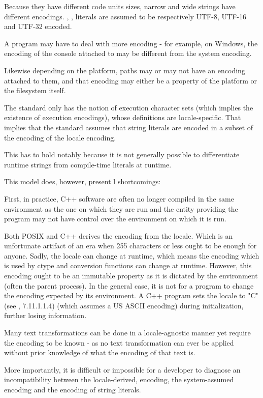 \documentclass{wg21}
\begin{document}
\note Because they have different code units sizes, narrow and wide strings have different encodings.
, ,  literals are assumed to be respectively UTF-8, UTF-16 and UTF-32 encoded.
\endnote

\note A program may have to deal with more encoding - for example, on Windows, the encoding of the console attached to  may be different from the system encoding.

Likewise depending on the platform, paths may or may not have an encoding attached to them, and that encoding may either be a property of the platform or the filesystem itself.
\endnote


The standard only has the notion of execution character sets (which implies the existence of execution encodings), whose definitions are locale-specific.
That implies that the standard assumes that string literals are encoded in a subset of the encoding of the locale encoding.

This has to hold notably because it is not generally possible to differentiate runtime strings from compile-time literals at runtime.

This model does, however, present l shortcomings:

First, in practice, C++ software are often no longer compiled in the same environment as the one on which they are run and the entity providing the program may not have control over the environment on which it is run.

Both POSIX and C++ derives the encoding from the locale. Which is an unfortunate artifact of an era when 255 characters or less ought to be enough for anyone.
Sadly, the locale can change at runtime, which means the encoding which is used by ctype and conversion functions can change at runtime.
However, this encoding ought to be an immutable property as it is dictated by the environment (often the parent process).
In the general case, it is not for a program to change the encoding expected by its environment.
A C++ program sets the locale to "C" (see \cite{N2346}, 7.11.1.1.4) (which assumes a US ASCII encoding) during initialization, further losing information.


Many text transformations can be done in a locale-agnostic manner yet require the encoding to be known - as no text transformation can ever be applied without
prior knowledge of what the encoding of that text is.

More importantly, it is difficult or impossible for a developer to diagnose an incompatibility between the locale-derived, encoding, the system-assumed encoding and
the encoding of string literals.
\end{document}
